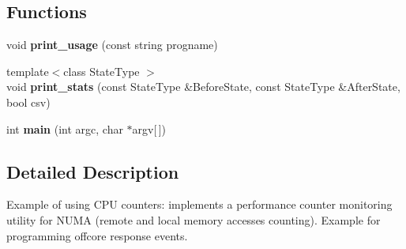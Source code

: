 \subsection*{Functions}
\begin{DoxyCompactItemize}
\item 
\mbox{\label{pcm-numa_8cpp_a4e43544978d9afb2faf08dce11cab70c}} 
void {\bfseries print\+\_\+usage} (const string progname)
\item 
\mbox{\label{pcm-numa_8cpp_a7243fae61218414d06c7c36701bdae9d}} 
{\footnotesize template$<$class State\+Type $>$ }\\void {\bfseries print\+\_\+stats} (const State\+Type \&Before\+State, const State\+Type \&After\+State, bool csv)
\item 
\mbox{\label{pcm-numa_8cpp_a0ddf1224851353fc92bfbff6f499fa97}} 
int {\bfseries main} (int argc, char $\ast$argv\mbox{[}$\,$\mbox{]})
\end{DoxyCompactItemize}


\subsection{Detailed Description}
Example of using C\+PU counters\+: implements a performance counter monitoring utility for N\+U\+MA (remote and local memory accesses counting). Example for programming offcore response events. 

